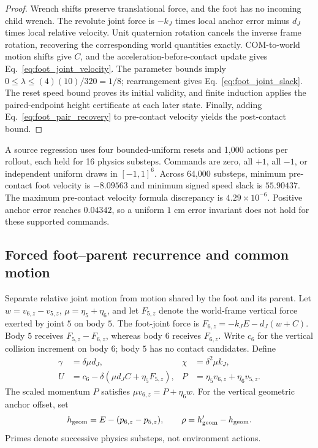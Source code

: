 \begin{proof}
Wrench shifts preserve translational force, and the foot has no incoming child wrench.
The revolute joint force is $-k_J$ times local anchor error minus $d_J$ times local relative velocity.
Unit quaternion rotation cancels the inverse frame rotation, recovering the corresponding world quantities exactly.
COM-to-world motion shifts give $C$, and the acceleration-before-contact update gives Eq.~\eqref{eq:foot_joint_velocity}.
The parameter bounds imply $0\le\lambda\le(4)(10)/320=1/8$; rearrangement gives Eq.~\eqref{eq:foot_joint_slack}.
The reset speed bound proves its initial validity, and finite induction applies the paired-endpoint height certificate at each later state.
Finally, adding Eq.~\eqref{eq:foot_pair_recovery} to pre-contact velocity yields the post-contact bound.
\end{proof}

A source regression uses four bounded-uniform resets and 1,000 actions per rollout, each held for 16 physics substeps.
Commands are zero, all $+1$, all $-1$, or independent uniform draws in $[-1,1]^6$.
Across 64,000 substeps, minimum pre-contact foot velocity is $-8.09563$ and minimum signed speed slack is $55.90437$.
The maximum pre-contact velocity formula discrepancy is $4.29\times10^{-6}$.
Positive anchor error reaches $0.04342$, so a uniform $1$ cm error invariant does not hold for these supported commands.

\subsection{Forced foot--parent recurrence and common motion}
\label{app:foot_recurrence}

Separate relative joint motion from motion shared by the foot and its parent.
Let $w=v_{6,z}-v_{5,z}$, $\mu=\eta_5+\eta_6$, and let $F_{5,z}$ denote the world-frame vertical force exerted by joint $5$ on body $5$.
The foot-joint force is $F_{6,z}=-k_J E-d_J(w+C)$.
Body $5$ receives $F_{5,z}-F_{6,z}$, whereas body $6$ receives $F_{6,z}$.
Write $c_6$ for the vertical collision increment on body $6$; body $5$ has no contact candidates.
Define
\begin{align}
 \gamma&=\delta\mu d_J, & \chi&=\delta^2\mu k_J,\nonumber\\
 U&=c_6-\delta(\mu d_J C+\eta_5F_{5,z}), &
 P&=\eta_5v_{6,z}+\eta_6v_{5,z}.
\end{align}
The scaled momentum $P$ satisfies $\mu v_{6,z}=P+\eta_6w$.
For the vertical geometric anchor offset, set
\begin{equation}
 h_{\rm geom}=E-(p_{6,z}-p_{5,z}),
 \qquad \rho=h'_{\rm geom}-h_{\rm geom}.
\end{equation}
Primes denote successive physics substeps, not environment actions.

